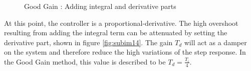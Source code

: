 \begin{figure}[H]
\hfill
{}
\hfill
{}
\hfill

\caption{Good Gain : Adding integral and derivative parts}
\end{figure}

At this point, the controller is a proportional-derivative. The high overshoot resulting from adding the integral term can be attenuated by setting the derivative part, shown in figure \ref{fig:subim14}. The gain $T_d$ will act as a damper on the system and therefore reduce the high variations of the step response. In the Good Gain method, this value is described to be $T_d = \frac{T_i}{4}$.



